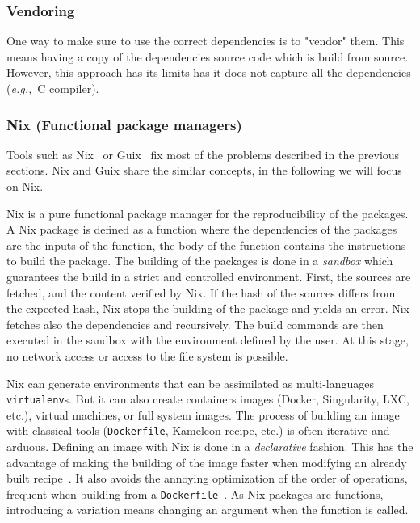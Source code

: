 \documentclass[sigconf]{acmart}
\newcommand{\eg}{\emph{e.g.,}}
\begin{document}
\subsubsection{Vendoring}

One way to make sure to use the correct dependencies is to "vendor" them.
This means having a copy of the dependencies source code which is build from source.
However, this approach has its limits has it does not capture all the dependencies (\eg\ C compiler).

\subsubsection{Nix (Functional package managers)}

Tools such as Nix\ \cite{dolstra_nix_2004} or Guix\ \cite{courtes_functional_2013} fix most of the problems described in the previous sections.
Nix and Guix share the similar concepts, in the following we will focus on Nix.

Nix is a pure functional package manager for the reproducibility of the packages.
A Nix package is defined as a function where the dependencies of the packages are the inputs of the function, the body of the function contains the instructions to build the package.
The building of the packages is done in a \emph{sandbox} which guarantees the build in a strict and controlled environment.
First, the sources are fetched, and the content verified by Nix.
If the hash of the sources differs from the expected hash, Nix stops the building of the package and yields an error.
Nix fetches also the dependencies and recursively.
The build commands are then executed in the sandbox with the environment defined by the user.
At this stage, no network access or access to the file system is possible.


Nix can generate environments that can be assimilated as multi-languages \texttt{virtualenv}s.
But it can also create containers images (Docker, Singularity, LXC, etc.), virtual machines, or full system images.
The process of building an image with classical tools (\texttt{Dockerfile}, Kameleon recipe, etc.) is often iterative and arduous.
Defining an image with Nix is done in a \emph{declarative} fashion.
This has the advantage of making the building of the image faster when modifying an already built recipe\ \cite{nxc}.
It also avoids the annoying optimization of the order of operations, frequent when building from a \texttt{Dockerfile}\ \cite{docker_cache}. 
As Nix packages are functions, introducing a variation means changing an argument when the function is called.
\end{document}
